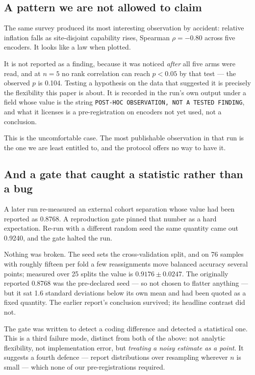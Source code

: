 \documentclass[11pt,a4paper]{article}
\begin{document}
\subsection{A pattern we are not allowed to claim}

The same survey produced its most interesting observation by accident: relative inflation falls as
site-disjoint capability rises, Spearman $\rho = -0.80$ across five encoders. It looks like a law when
plotted.

It is not reported as a finding, because it was noticed \emph{after} all five arms were read, and at
$n = 5$ no rank correlation can reach $p<0.05$ by that test --- the observed $p$ is 0.104. Testing a
hypothesis on the data that suggested it is precisely the flexibility this paper is about. It is
recorded in the run's own output under a field whose value is the string
\texttt{POST-HOC OBSERVATION, NOT A TESTED FINDING}, and what it licenses is a pre-registration on
encoders not yet used, not a conclusion.

This is the uncomfortable case. The most publishable observation in that run is the one we are least
entitled to, and the protocol offers no way to have it.

\subsection{And a gate that caught a statistic rather than a bug}

A later run re-measured an external cohort separation whose value had been reported as 0.8768. A
reproduction gate pinned that number as a hard expectation. Re-run with a different random seed the
same quantity came out 0.9240, and the gate halted the run.

Nothing was broken. The seed sets the cross-validation split, and on 76 samples with roughly fifteen
per fold a few reassignments move balanced accuracy several points; measured over 25 splits the value
is $0.9176 \pm 0.0247$. The originally reported 0.8768 was the pre-declared seed --- so not chosen to
flatter anything --- but it sat 1.6 standard deviations below its own mean and had been quoted as a
fixed quantity. The earlier report's conclusion survived; its headline contrast did not.

The gate was written to detect a coding difference and detected a statistical one. This is a third
failure mode, distinct from both of the above: not analytic flexibility, not implementation error, but
\emph{treating a noisy estimate as a point}. It suggests a fourth defence --- report distributions
over resampling wherever $n$ is small --- which none of our pre-registrations required.
\end{document}
